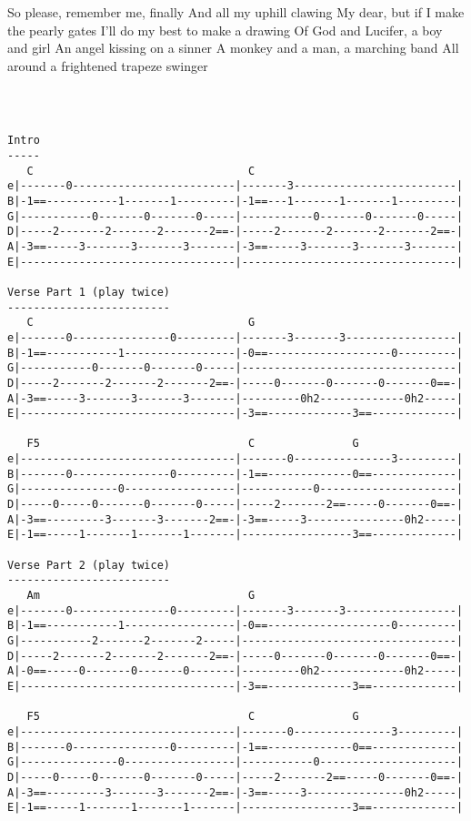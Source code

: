 So please, remember me, finally
And all my uphill clawing
My dear, but if I make the pearly gates
I'll do my best to make a drawing
Of God and Lucifer, a boy and girl
An angel kissing on a sinner
A monkey and a man, a marching band
All around a frightened trapeze swinger
\next%
\tab%
\begin{verbatim}



Intro
-----
   C                                 C
e|-------0-------------------------|-------3-------------------------|
B|-1==-----------1-------1---------|-1==---1-------1-------1---------|
G|-----------0-------0-------0-----|-----------0-------0-------0-----|
D|-----2-------2-------2-------2==-|-----2-------2-------2-------2==-|
A|-3==-----3-------3-------3-------|-3==-----3-------3-------3-------|
E|---------------------------------|---------------------------------|

Verse Part 1 (play twice)
-------------------------
   C                                 G
e|-------0---------------0---------|-------3-------3-----------------|
B|-1==-----------1-----------------|-0==-------------------0---------|
G|-----------0-------0-------0-----|---------------------------------|
D|-----2-------2-------2-------2==-|-----0-------0-------0-------0==-|
A|-3==-----3-------3-------3-------|---------0h2-------------0h2-----|
E|---------------------------------|-3==-------------3==-------------|

   F5                                C               G
e|---------------------------------|-------0---------------3---------|
B|-------0---------------0---------|-1==-------------0==-------------|
G|---------------0-----------------|-----------0---------------------|
D|-----0-----0-------0-------0-----|-----2-------2==-----0-------0==-|
A|-3==---------3-------3-------2==-|-3==-----3---------------0h2-----|
E|-1==-----1-------1-------1-------|-----------------3==-------------|

Verse Part 2 (play twice)
-------------------------
   Am                                G
e|-------0---------------0---------|-------3-------3-----------------|
B|-1==-----------1-----------------|-0==-------------------0---------|
G|-----------2-------2-------2-----|---------------------------------|
D|-----2-------2-------2-------2==-|-----0-------0-------0-------0==-|
A|-0==-----0-------0-------0-------|---------0h2-------------0h2-----|
E|---------------------------------|-3==-------------3==-------------|

   F5                                C               G
e|---------------------------------|-------0---------------3---------|
B|-------0---------------0---------|-1==-------------0==-------------|
G|---------------0-----------------|-----------0---------------------|
D|-----0-----0-------0-------0-----|-----2-------2==-----0-------0==-|
A|-3==---------3-------3-------2==-|-3==-----3---------------0h2-----|
E|-1==-----1-------1-------1-------|-----------------3==-------------|
\end{verbatim}
\next
\vfil
\next
